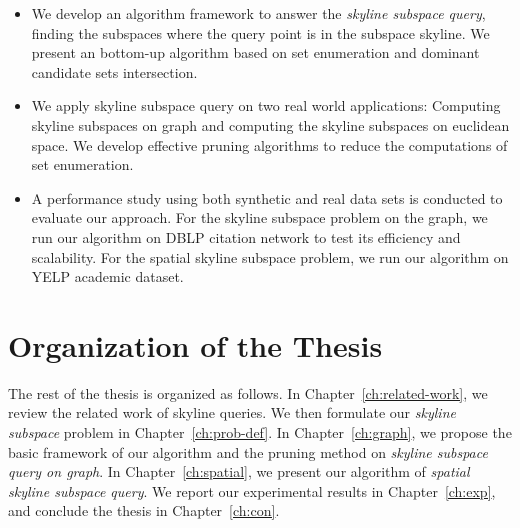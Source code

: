\begin{itemize}
\item We develop an algorithm framework to answer the \emph{skyline subspace query}, finding the subspaces where the query point is in the subspace skyline. We present an bottom-up algorithm based on set enumeration and dominant candidate sets intersection.

\item We apply skyline subspace query on two real world applications: Computing skyline subspaces on graph and computing the skyline subspaces on euclidean space. We develop effective pruning algorithms to reduce the computations of set enumeration.

\item A performance study using both synthetic and real data sets is conducted to evaluate our approach. For the skyline subspace problem on the graph, we run our algorithm on DBLP citation network to test its efficiency and scalability. For the spatial skyline subspace problem, we run our algorithm on YELP academic dataset.
\end{itemize}
  

\section{Organization of the Thesis}
The rest of the thesis is organized as follows. In Chapter~\ref{ch:related-work}, we review the related work of skyline queries. We then formulate our \emph{skyline subspace} problem in Chapter~\ref{ch:prob-def}. In Chapter~\ref{ch:graph}, we propose the basic framework of our algorithm and the pruning method on \emph{skyline subspace query on graph}.  In Chapter~\ref{ch:spatial}, we present our algorithm of \emph{spatial skyline subspace query}.  We report our experimental results in Chapter~\ref{ch:exp}, and conclude the thesis in Chapter~\ref{ch:con}.










